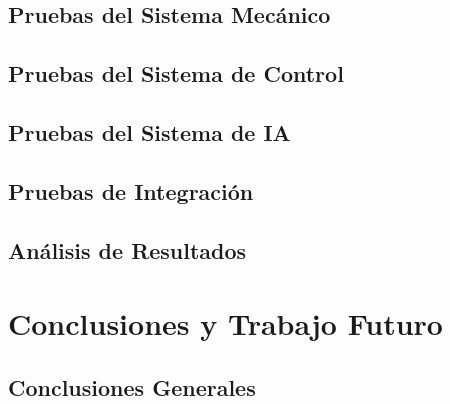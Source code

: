 \documentclass[a4paper,12pt]{report}
\begin{document}
\section{Pruebas del Sistema Mecánico}





\section{Pruebas del Sistema de Control}




\section{Pruebas del Sistema de IA}






\section{Pruebas de Integración}




\section{Análisis de Resultados}




\chapter{Conclusiones y Trabajo Futuro}

\section{Conclusiones Generales}



\end{document}
